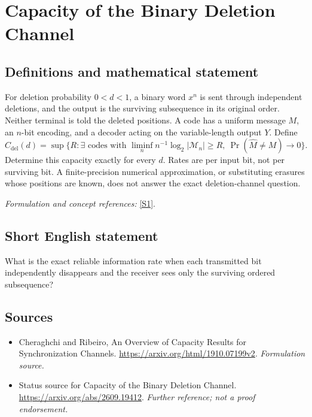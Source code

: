 \documentclass[11pt]{article}
\begin{document}
\section*{\texorpdfstring{Capacity of the Binary Deletion Channel}{Capacity of the Binary Deletion Channel}}\label{30006798}
\subsection{Definitions and mathematical statement}
For deletion probability $0<d<1$, a binary word $x^n$ is sent through independent deletions, and the output is the surviving subsequence in its original order. Neither terminal is told the deleted positions. A code has a uniform message $M$, an $n$-bit encoding, and a decoder acting on the variable-length output $Y$. Define
\[
 C_{\mathrm{del}}(d)=\sup\{R:\exists\text{ codes with }\liminf_n n^{-1}\log_2|\mathcal M_n|\ge R,
 \ \Pr(\widehat M\ne M)\to0\}.
\]
Determine this capacity exactly for every $d$. Rates are per input bit, not per surviving bit. A finite-precision numerical approximation, or substituting erasures whose positions are known, does not answer the exact deletion-channel question.
\par\smallskip\textit{Formulation and concept references:} \href{https://arxiv.org/html/1910.07199v2}{[S1]}.

\subsection{Short English statement}
What is the exact reliable information rate when each transmitted bit independently disappears and the receiver sees only the surviving ordered subsequence?
\subsection{Sources}
\begin{itemize}
\item[S1]Cheraghchi and Ribeiro, An Overview of Capacity Results for Synchronization Channels.
\url{https://arxiv.org/html/1910.07199v2}.
\textit{Formulation source.}
\item[S2]Status source for Capacity of the Binary Deletion Channel.
\url{https://arxiv.org/abs/2609.19412}.
\textit{Further reference; not a proof endorsement.}
\end{itemize}
\end{document}
